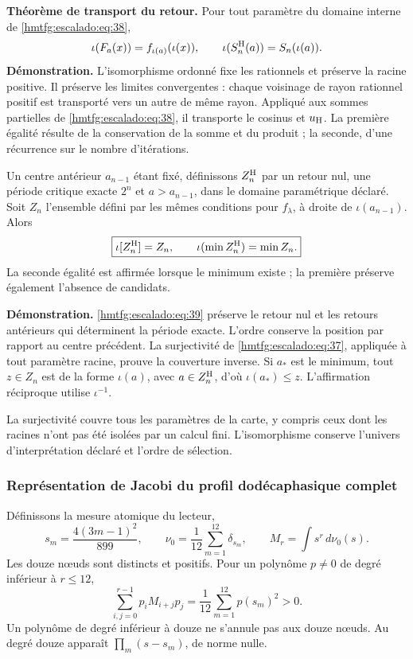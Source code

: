 \textbf{Théorème de transport du retour.} Pour tout paramètre du domaine interne de \eqref{hmtfg:escalado:eq:38},
\begin{equation}
\iota(F_a(x))=f_{\iota(a)}(\iota(x)),\qquad
\iota(S_n^{\rm H}(a))=S_n(\iota(a)).
\label{hmtfg:escalado:eq:39}
\end{equation}
\textbf{Démonstration.} L’isomorphisme ordonné fixe les rationnels et préserve la racine positive. Il préserve les limites convergentes : chaque voisinage de rayon rationnel positif est transporté vers un autre de même rayon. Appliqué aux sommes partielles de \eqref{hmtfg:escalado:eq:38}, il transporte le cosinus et \(u_{\rm H}\). La première égalité résulte de la conservation de la somme et du produit ; la seconde, d’une récurrence sur le nombre d’itérations.

Un centre antérieur \(a_{n-1}\) étant fixé, définissons \(Z_n^{\rm H}\) par un retour nul, une période critique exacte \(2^n\) et \(a>a_{n-1}\), dans le domaine paramétrique déclaré. Soit \(Z_n\) l’ensemble défini par les mêmes conditions pour \(f_\lambda\), à droite de \(\iota(a_{n-1})\). Alors
\begin{equation}
\boxed{\iota[Z_n^{\rm H}]=Z_n,\qquad
\iota(\min Z_n^{\rm H})=\min Z_n.}
\label{hmtfg:escalado:eq:40}
\end{equation}
La seconde égalité est affirmée lorsque le minimum existe ; la première préserve également l’absence de candidats.

\textbf{Démonstration.} \eqref{hmtfg:escalado:eq:39} préserve le retour nul et les retours antérieurs qui déterminent la période exacte. L’ordre conserve la position par rapport au centre précédent. La surjectivité de \eqref{hmtfg:escalado:eq:37}, appliquée à tout paramètre racine, prouve la couverture inverse. Si \(a_*\) est le minimum, tout \(z\in Z_n\) est de la forme \(\iota(a)\), avec \(a\in Z_n^{\rm H}\), d’où \(\iota(a_*)\le z\). L’affirmation réciproque utilise \(\iota^{-1}\).

La surjectivité couvre tous les paramètres de la carte, y compris ceux dont les racines n’ont pas été isolées par un calcul fini. L’isomorphisme conserve l’univers d’interprétation déclaré et l’ordre de sélection.

\subsubsection{Représentation de Jacobi du profil dodécaphasique complet}
\label{hmtfg:escalado:14.2}

Définissons la mesure atomique du lecteur,
\begin{equation}
s_m=\frac{4(3m-1)^2}{899},\qquad
\nu_0=\frac1{12}\sum_{m=1}^{12}\delta_{s_m},\qquad
M_r=\int s^r\,d\nu_0(s).
\label{hmtfg:escalado:eq:41}
\end{equation}
Les douze nœuds sont distincts et positifs. Pour un polynôme \(p\ne0\) de degré inférieur à \(r\le12\),
\begin{equation}
\sum_{i,j=0}^{r-1}p_iM_{i+j}p_j
=\frac1{12}\sum_{m=1}^{12}p(s_m)^2>0.
\label{hmtfg:escalado:eq:42}
\end{equation}
Un polynôme de degré inférieur à douze ne s’annule pas aux douze nœuds. Au degré douze apparaît \(\prod_m(s-s_m)\), de norme nulle.

